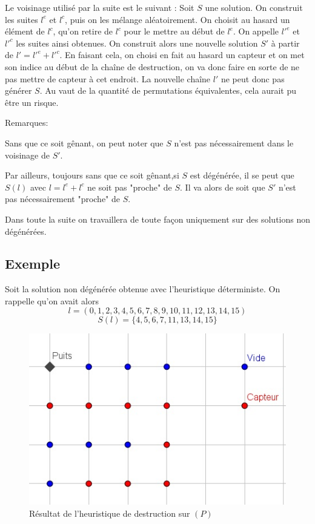 \documentclass[12pt,a4paper]{article}
\begin{document}
Le voisinage utilisé par la suite est le suivant :
Soit $S$ une solution. On construit les suites $l^e$ et $l^c$, puis on les mélange aléatoirement. On choisit au hasard un élément de $l^c$, qu'on retire de $l^c$ pour le mettre au début de $l^e$. On appelle $l'^e$ et $l'^c$ les suites ainsi obtenues. On construit alors une nouvelle solution $S'$ à partir de $l'=l'^e+l'^c$.
En faisant cela, on choisi en fait au hasard un capteur et on met son indice au début de la chaîne de destruction, on va donc faire en sorte  de ne pas mettre de capteur à cet endroit. La nouvelle chaîne $l'$ ne peut donc pas générer $S$. Au vaut de la quantité de permutations équivalentes, cela aurait pu être un risque.

Remarques:

Sans que ce soit gênant, on peut noter que $S$ n'est pas nécessairement dans le voisinage de $S'$.

Par ailleurs, toujours sans que ce soit gênant,si $S$ est dégénérée, il se peut que $S(l)$ avec $l=l^e+l^c$ ne soit pas "proche" de $S$. Il va alors de soit que $S'$ n'est pas nécessairement "proche" de $S$.

Dans toute la suite on travaillera de toute façon uniquement sur des solutions non dégénérées. 
\subsection{Exemple}
Soit la solution non dégénérée obtenue avec l'heuristique déterministe.
On rappelle qu'on avait alors
\[l=(0,1,2,3,4,5,6,7,8,9,10,11,12,13,14,15)\] 
\[S(l)=\{4,5,6,7,11,13,14,15\}\]
\begin{figure}[h]
\center
\includegraphics[scale=1]{Images/4_1_1_naif.jpg}
\caption{Résultat de l'heuristique de destruction sur $(P)$}
\end{figure}
\end{document}
